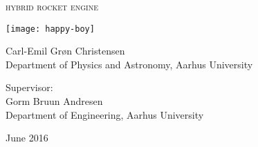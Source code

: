
\begin{titlingpage}

\begin{center}

\vspace*{0cm}
\huge
\textsc{hybrid rocket engine}\\
\vspace{1.5cm}

\texttt{[image: happy-boy]}

\large
{
    Carl-Emil Grøn Christensen\\
    Department of Physics and Astronomy, Aarhus University
}

\vspace{1.5cm}

{
  Supervisor:\\
  Gorm Bruun Andresen\\
  Department of Engineering, Aarhus University
}

\vspace{1.5cm}
{June 2016}\\


\end{center}



\end{titlingpage}
